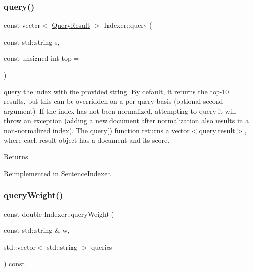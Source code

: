 \mbox{\label{classIndexer_abd1dd6a6da0c9e43efaa99866c538e6c}} 
\subsubsection{\texorpdfstring{query()}{query()}}
{\footnotesize\ttfamily const vector$<$ \hyperlink{classQueryResult}{Query\+Result} $>$ Indexer\+::query (\begin{DoxyParamCaption}\item[{const std\+::string}]{s,  }\item[{const unsigned int}]{top = {} }\end{DoxyParamCaption})\hspace{0.3cm}{\ttfamily [virtual]}}

query the index with the provided string. By default, it returns the top-\/10 results, but this can be overridden on a per-\/query basis (optional second argument). If the index has not been normalized, attempting to query it will throw an exception (adding a new document after normalization also results in a non-\/normalized index). The \hyperlink{classIndexer_abd1dd6a6da0c9e43efaa99866c538e6c}{query()} function returns a vector$<$query result$>$, where each result object has a document and its score. \begin{DoxyReturn}{Returns}

\end{DoxyReturn}


Reimplemented in \hyperlink{classSentenceIndexer_ac9b17bde40b851d8e0c263ce2241b9c4}{Sentence\+Indexer}.

\mbox{\label{classIndexer_a3ed434e77eb37143f76b940e37cd878e}} 
\subsubsection{\texorpdfstring{query\+Weight()}{queryWeight()}}
{\footnotesize\ttfamily const double Indexer\+::query\+Weight (\begin{DoxyParamCaption}\item[{const std\+::string \&}]{w,  }\item[{std\+::vector$<$ std\+::string $>$}]{queries }\end{DoxyParamCaption}) const\hspace{0.3cm}{\ttfamily [protected]}}

